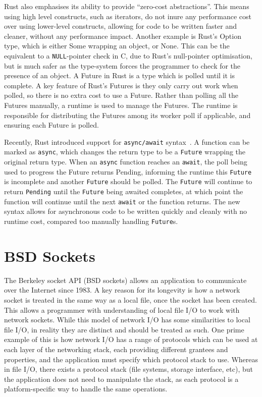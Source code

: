 Rust also emphasises its ability to provide “zero-cost abstractions”.
This means using high level constructs, such as iterators, do not inure any performance cost over using lower-level
constructs, allowing for code to be written faster and cleaner, without any performance impact.
Another example is Rust's Option type, which is either Some wrapping an object, or None.
This can be the equivalent to a \texttt{NULL}-pointer check in C, due to Rust's null-pointer optimisation, but is much
safer as the type-system forces the programmer to check for the presence of an object.
A Future in Rust is a type which is polled until it is complete.
A key feature of Rust's Futures is they only carry out work when polled, so there is no extra cost to use a Future.
Rather than polling all the Futures manually, a runtime is used to manage the Futures.
The runtime is responsible for distributing the Futures among its worker poll if applicable, and ensuring each Future is
polled.

Recently, Rust introduced support for \texttt{async/await} syntax~\citep{withoutboats_asyncawaitnotation_}.
A function can be marked as \texttt{async}, which changes the return type to be a \texttt{Future} wrapping the original
return type.
When an \texttt{async} function reaches an \texttt{await}, the poll being used to progress the Future returns Pending,
informing the runtime this \texttt{Future} is incomplete and another \texttt{Future} should be polled.
The \texttt{Future} will continue to return \texttt{Pending} until the \texttt{Future} being awaited completes,
at which point the function will continue until the next \texttt{await} or the function returns.
The new syntax allows for asynchronous code to be written quickly and cleanly with no runtime cost, compared too
manually handling \texttt{Future}s.

\section{BSD Sockets}\label{sec:bsd-sockets}
The Berkeley socket API (BSD sockets) allows an application to communicate over the Internet since 1983.
A key reason for its longevity is how a network socket is treated in the same way as a local file, once the socket has
been created.
This allows a programmer with understanding of local file I/O to work with network sockets.
While this model of network I/O has some similarities to local file I/O, in reality they are distinct and should be
treated as such.
One prime example of this is how network I/O has a range of protocols which can be used at each layer of the networking
stack, each providing different grantees and properties, and the application must specify which protocol stack to use.
Whereas in file I/O, there exists a protocol stack (file systems, storage interface, etc), but the application does not
need to manipulate the stack, as each protocol is a platform-specific way to handle the same operations.

